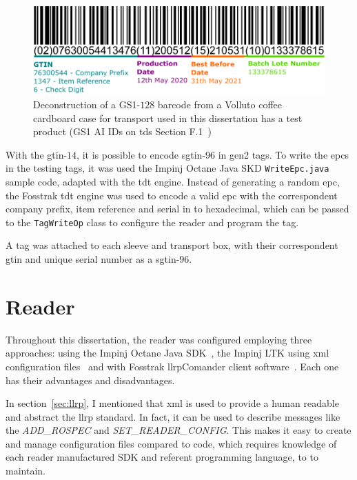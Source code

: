 \begin{figure}
    \centering
    \includegraphics[width=\textwidth]{figs/gs1-128barcode.pdf}
    \caption{Deconstruction of a GS1-$128$ barcode from a Volluto coffee cardboard case for transport used in this dissertation has a test product (GS1 AI IDs on \acs{tds} Section F.1~\cite{EPCTagData})}
    \label{fig:gs1-128barcode}
\end{figure}

With the \acs{gtin}-$14$, it is possible to encode \ac{sgtin}-$96$ in \ac{gen2} tags. To write the \acp{epc} in the testing tags, it was used the Impinj Octane Java SKD \texttt{WriteEpc.java} sample code, adapted with the \ac{tdt} engine. Instead of generating a random \ac{epc}, the Fosstrak \ac{tdt} engine was used to encode a valid \ac{epc} with the correspondent company prefix, item reference and serial in to hexadecimal, which can be passed to the \texttt{TagWriteOp} class to configure the reader and program the tag.

A tag was attached to each sleeve and transport box, with their correspondent \ac{gtin} and unique serial number as a \ac{sgtin}-$96$.

\section{Reader} \label{sec:readerconfiguration}

Throughout this dissertation, the reader was configured employing three approaches: using the Impinj Octane Java SDK~\cite{OctaneSDK}, the Impinj LTK using \ac{xml} configuration files~\cite{LTKXMLJava} and with Fosstrak \ac{llrp}Comander client software~\cite{FosstrakLLRPCommander}.
Each one has their advantages and disadvantages.

In section~\ref{sec:llrp}, I mentioned that \ac{xml} is used to provide a human readable and abstract the \ac{llrp} standard.
In fact, it can be used to describe messages like the \textit{ADD\_ROSPEC} and \textit{SET\_READER\_CONFIG}.
This makes it easy to create and manage configuration files compared to code, which requires knowledge of each reader manufactured SDK and referent programming language, to to maintain.

